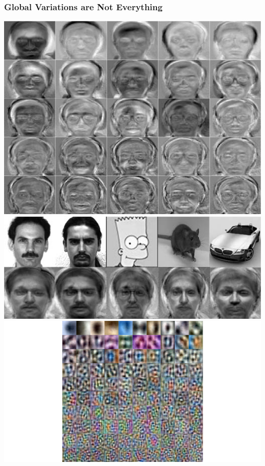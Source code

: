 \documentclass{beamer}
\begin{document}
\begin{frame}
\frametitle{Global Variations are Not Everything} 
\begin{center}
\includegraphics[scale = 0.2]{eigenfaces.jpg}
\includegraphics[scale = 0.2]{nonfaces.jpg}\\
\includegraphics[scale = 0.2]{ColorPCA.png}
\end{center} 
\end{frame}
\end{document}
